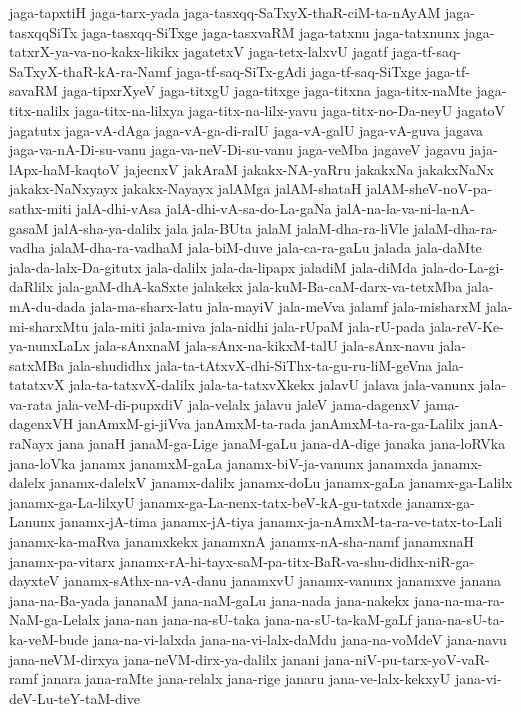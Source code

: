 {jaga-tapxtiH
jaga-tarx-yada
jaga-tasxqq-SaTxyX-thaR-ciM-ta-nAyAM
jaga-tasxqqSiTx
jaga-tasxqq-SiTxge
jaga-tasxvaRM
jaga-tatxnu
jaga-tatxnunx
jaga-tatxrX-ya-va-no-kakx-likikx
jagatetxV
jaga-tetx-lalxvU
jagatf
jaga-tf-saq-SaTxyX-thaR-kA-ra-Namf
jaga-tf-saq-SiTx-gAdi
jaga-tf-saq-SiTxge
jaga-tf-savaRM
jaga-tipxrXyeV
jaga-titxgU
jaga-titxge
jaga-titxna
jaga-titx-naMte
jaga-titx-nalilx
jaga-titx-na-lilxya
jaga-titx-na-lilx-yavu
jaga-titx-no-Da-neyU
jagatoV
jagatutx
jaga-vA-dAga
jaga-vA-ga-di-ralU
jaga-vA-galU
jaga-vA-guva
jagava
jaga-va-nA-Di-su-vanu
jaga-va-neV-Di-su-vanu
jaga-veMba
jagaveV
jagavu
jaja-lApx-haM-kaqtoV
jajecnxV
jakAraM
jakakx-NA-yaRru
jakakxNa
jakakxNaNx
jakakx-NaNxyayx
jakakx-Nayayx
jalAMga
jalAM-shataH
jalAM-sheV-noV-pa-sathx-miti
jalA-dhi-vAsa
jalA-dhi-vA-sa-do-La-gaNa
jalA-na-la-va-ni-la-nA-gasaM
jalA-sha-ya-dalilx
jala
jala-BUta
jalaM
jalaM-dha-ra-liVle
jalaM-dha-ra-vadha
jalaM-dha-ra-vadhaM
jala-biM-duve
jala-ca-ra-gaLu
jalada
jala-daMte
jala-da-lalx-Da-gitutx
jala-dalilx
jala-da-lipapx
jaladiM
jala-diMda
jala-do-La-gi-daRlilx
jala-gaM-dhA-kaSxte
jalakekx
jala-kuM-Ba-caM-darx-va-tetxMba
jala-mA-du-dada
jala-ma-sharx-latu
jala-mayiV
jala-meVva
jalamf
jala-misharxM
jala-mi-sharxMtu
jala-miti
jala-miva
jala-nidhi
jala-rUpaM
jala-rU-pada
jala-reV-Ke-ya-nunxLaLx
jala-sAnxnaM
jala-sAnx-na-kikxM-talU
jala-sAnx-navu
jala-satxMBa
jala-shudidhx
jala-ta-tAtxvX-dhi-SiThx-ta-gu-ru-liM-geVna
jala-tatatxvX
jala-ta-tatxvX-dalilx
jala-ta-tatxvXkekx
jalavU
jalava
jala-vanunx
jala-va-rata
jala-veM-di-pupxdiV
jala-velalx
jalavu
jaleV
jama-dagenxV
jama-dagenxVH
janAmxM-gi-jiVva
janAmxM-ta-rada
janAmxM-ta-ra-ga-Lalilx
janA-raNayx
jana
janaH
janaM-ga-Lige
janaM-gaLu
jana-dA-dige
janaka
jana-loRVka
jana-loVka
janamx
janamxM-gaLa
janamx-biV-ja-vanunx
janamxda
janamx-dalelx
janamx-dalelxV
janamx-dalilx
janamx-doLu
janamx-gaLa
janamx-ga-Lalilx
janamx-ga-La-lilxyU
janamx-ga-La-nenx-tatx-beV-kA-gu-tatxde
janamx-ga-Lanunx
janamx-jA-tima
janamx-jA-tiya
janamx-ja-nAmxM-ta-ra-ve-tatx-to-Lali
janamx-ka-maRva
janamxkekx
janamxnA
janamx-nA-sha-namf
janamxnaH
janamx-pa-vitarx
janamx-rA-hi-tayx-saM-pa-titx-BaR-va-shu-didhx-niR-ga-dayxteV
janamx-sAthx-na-vA-danu
janamxvU
janamx-vanunx
janamxve
janana
jana-na-Ba-yada
jananaM
jana-naM-gaLu
jana-nada
jana-nakekx
jana-na-ma-ra-NaM-ga-Lelalx
jana-nan
jana-na-sU-taka
jana-na-sU-ta-kaM-gaLf
jana-na-sU-ta-ka-veM-bude
jana-na-vi-lalxda
jana-na-vi-lalx-daMdu
jana-na-voMdeV
jana-navu
jana-neVM-dirxya
jana-neVM-dirx-ya-dalilx
janani
jana-niV-pu-tarx-yoV-vaR-ramf
janara
jana-raMte
jana-relalx
jana-rige
janaru
jana-ve-lalx-kekxyU
jana-vi-deV-Lu-teY-taM-dive
}
